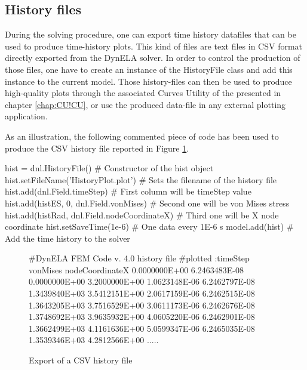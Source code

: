 \subsection{History files}

During the solving procedure, one can export time history datafiles that can be used to produce time-history plots. This kind of files are text files in CSV format directly exported from the DynELA solver. In order to control the production of those files, one have to create an instance of the \textsf{HistoryFile} class and add this instance to the current model. Those history-files can then be used to produce high-quality plots through the associated \textsf{Curves Utility} of the \DynELA presented in chapter \ref{chap:CU!CU}, or use the produced data-file in any external plotting application.

As an illustration, the following commented piece of code has been used to produce the CSV history file reported in Figure \ref{fig:PL!HF!Export}.
\begin{PythonListing}
hist = dnl.HistoryFile()              # Constructor of the hist object
hist.setFileName('HistoryPlot.plot')  # Sets the filename of the history file
hist.add(dnl.Field.timeStep)                 # First column will be timeStep value
hist.add(histES, 0, dnl.Field.vonMises)      # Second one will be von Mises stress
hist.add(histRad, dnl.Field.nodeCoordinateX) # Third one will be X node coordinate
hist.setSaveTime(1e-6)                       # One data every 1E-6 s
model.add(hist)                              # Add the time history to the solver
\end{PythonListing}

\begin{figure}[h]
\begin{centering}
\begin{BashListing}
#DynELA FEM Code v. 4.0 history file
#plotted :timeStep vonMises nodeCoordinateX
0.0000000E+00 6.2463483E-08 0.0000000E+00 3.2000000E+00
1.0623148E-06 6.2462797E-08 1.3439840E+03 3.5412151E+00
2.0617159E-06 6.2462515E-08 1.3643205E+03 3.7516529E+00
3.0611173E-06 6.2462676E-08 1.3748692E+03 3.9635932E+00
4.0605220E-06 6.2462901E-08 1.3662499E+03 4.1161636E+00
5.0599347E-06 6.2465035E-08 1.3539346E+03 4.2812566E+00
.....
\end{BashListing}
\par\end{centering}
\caption{Export of a CSV history file\label{fig:PL!HF!Export}}
\end{figure}

